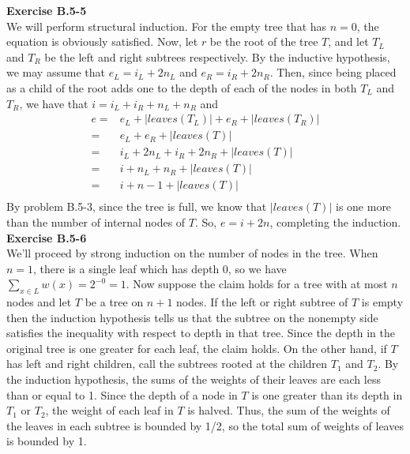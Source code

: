 \documentclass{article}
\begin{document}
\noindent\textbf{Exercise B.5-5}\\
We will perform structural induction. For the empty tree that has $n=0$, the equation is obviously satisfied. Now, let $r$ be the root of the tree $T$, and let $T_L$ and $T_R$ be the left and right subtrees respectively. By the inductive hypothesis, we may assume that $e_L = i_L + 2n_L$ and $e_R = i_R + 2 n_R$. Then, since being placed as a child of the root adds one to the depth of each of the nodes in both $T_L$ and $T_R$, we have that $i = i_L + i_R + n_L+n_R$ and 
\begin{align*}
e =& e_L + |leaves(T_L)| + e_R +|leaves(T_R)| \\
=& e_L + e_R + |leaves(T)| \\
=& i_L + 2 n_L + i_R + 2n_R + |leaves(T)| \\
=& i + n_L + n_R + |leaves(T)| \\
=& i + n-1 + |leaves(T)| \\
\end{align*}
 By problem B.5-3, since the tree is full, we know that $|leaves(T)|$ is one more than the number of internal nodes of $T$. So, $e =  i+ 2n$, completing the induction.\\

\noindent\textbf{Exercise B.5-6}\\

We'll proceed by strong induction on the number of nodes in the tree.  When $n=1$, there is a single leaf which has depth 0, so we have $\sum_{x \in L} w(x) = 2^{-0} = 1$.  Now suppose the claim holds for a tree with at most $n$ nodes and let $T$ be a tree on $n+1$ nodes.  If the left or right subtree of $T$ is empty then the induction hypothesis tells us that the subtree on the nonempty side satisfies the inequality with respect to depth in that tree.  Since the depth in the original tree is one greater for each leaf, the claim holds. On the other hand, if $T$ has left and right children, call the subtrees rooted at the children $T_1$ and $T_2$.  By the induction hypothesis, the sums of the weights of their leaves are each less than or equal to 1.  Since the depth of a node in $T$ is one greater than its depth in $T_1$ or $T_2$, the weight of each leaf in $T$ is halved.  Thus, the sum of the weights of the leaves in each subtree is bounded by 1/2, so the total sum of weights of leaves is bounded by 1. \\
\end{document}
